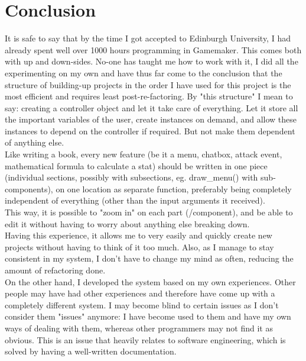 \documentclass[12pt]{report}
\begin{document}
\section*{Conclusion}
It is safe to say that by the time I got accepted to Edinburgh University, I had already spent well over 1000 hours programming in Gamemaker. This comes both with up and down-sides.\newpage 
No-one has taught me how to work with it, I did all the experimenting on my own and have thus far come to the conclusion that the structure of building-up projects in the order I have used for this project is the most efficient and requires least post-re-factoring. By "this structure" I mean to say: creating a controller object and let it take care of everything. Let it store all the important variables of the user, create instances on demand, and allow these instances to depend on the controller if required. But not make them dependent of anything else.\\
Like writing a book, every new feature (be it a menu, chatbox, attack event, mathematical formula to calculate a stat) should be written in one piece (individual sections, possibly with subsections, eg. draw\_menu() with sub-components), on one location as separate function, preferably being completely independent of everything (other than the input arguments it received).\\
This way, it is possible to "zoom in" on each part (/component), and be able to edit it without having to worry about anything else breaking down.\\
Having this experience, it allows me to very easily and quickly create new projects without having to think of it too much. Also, as I manage to stay consistent in my system, I don't have to change my mind as often, reducing the amount of refactoring done.\\
On the other hand, I developed the system based on my own experiences. Other people may have had other experiences and therefore have come up with a completely different system. I may become blind to certain issues as I don't consider them "issues" anymore: I have become used to them and have my own ways of dealing with them, whereas other programmers may not find it as obvious. This is an issue that heavily relates to software engineering, which is solved by having a well-written documentation.
\end{document}

